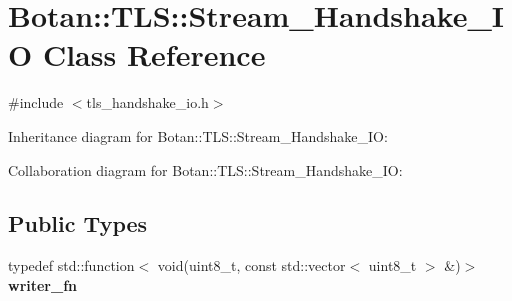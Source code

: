 \hypertarget{class_botan_1_1_t_l_s_1_1_stream___handshake___i_o}{}\section{Botan\+:\+:T\+LS\+:\+:Stream\+\_\+\+Handshake\+\_\+\+IO Class Reference}
\label{class_botan_1_1_t_l_s_1_1_stream___handshake___i_o}


{\ttfamily \#include $<$tls\+\_\+handshake\+\_\+io.\+h$>$}



Inheritance diagram for Botan\+:\+:T\+LS\+:\+:Stream\+\_\+\+Handshake\+\_\+\+IO\+:


Collaboration diagram for Botan\+:\+:T\+LS\+:\+:Stream\+\_\+\+Handshake\+\_\+\+IO\+:
\subsection*{Public Types}
\begin{DoxyCompactItemize}
\item 
\mbox{\label{class_botan_1_1_t_l_s_1_1_stream___handshake___i_o_aeb5857231d21a61ff8ae2f0cede0e445}} 
typedef std\+::function$<$ void(uint8\+\_\+t, const std\+::vector$<$ uint8\+\_\+t $>$ \&)$>$ {\bfseries writer\+\_\+fn}
\end{DoxyCompactItemize}
